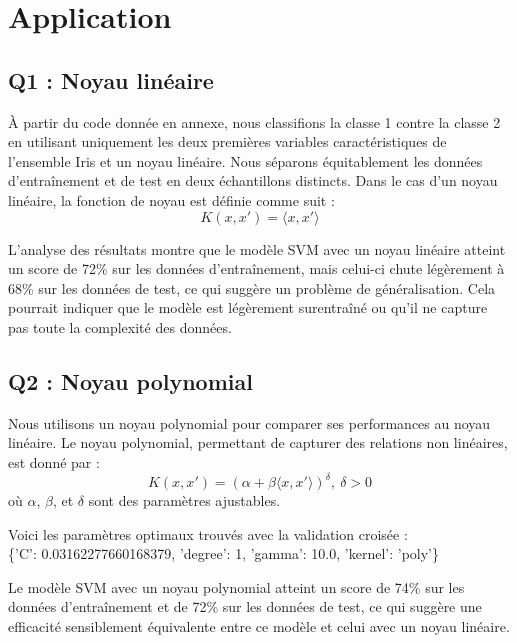 \documentclass{scrartcl}
\begin{document}
\section{Application}

\subsection{Q1 : Noyau linéaire}
\hspace{7pt} À partir du code donnée en annexe, nous classifions la classe 1 contre la classe 2 en utilisant uniquement les deux premières variables caractéristiques de l'ensemble Iris et un noyau linéaire. Nous séparons équitablement les données d'entraînement et de test en deux échantillons distincts. Dans le cas d'un noyau linéaire, la fonction de noyau est définie comme suit :
\[
K(x, x') = \langle x, x' \rangle
\]
    
L'analyse des résultats montre que le modèle SVM avec un noyau linéaire atteint un score de 72\% sur les données d'entraînement, mais celui-ci chute légèrement à 68\% sur les données de test, ce qui suggère un problème de généralisation. Cela pourrait indiquer que le modèle est légèrement surentraîné ou qu'il ne capture pas toute la complexité des données.

\subsection{Q2 : Noyau polynomial}

\hspace{7pt} Nous utilisons un noyau polynomial pour comparer ses performances au noyau linéaire. Le noyau polynomial, permettant de capturer des relations non linéaires, est donné par :
\[
K(x, x') = (\alpha + \beta \langle x, x' \rangle)^\delta, \ \delta > 0
\]
    où \(\alpha\), \(\beta\), et \(\delta\) sont des paramètres ajustables.\newline
    
Voici les paramètres optimaux trouvés avec la validation croisée :\\
\{'C': 0.03162277660168379, 'degree': 1, 'gamma': 10.0, 'kernel': 'poly'\}\newline

Le modèle SVM avec un noyau polynomial atteint un score de 74\% sur les données d'entraînement et de 72\% sur les données de test, ce qui suggère une efficacité sensiblement équivalente entre ce modèle et celui avec un noyau linéaire.\newline
\end{document}
